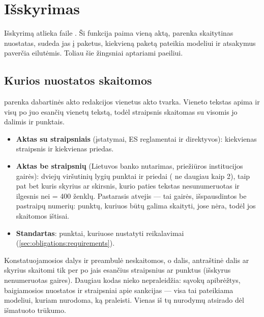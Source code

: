 \section{Išskyrimas}\label{sec:obligations:extraction}

Išskyrimą atlieka  faile . Ši funkcija paima vieną
aktą, parenka skaitytinas nuostatas, sudeda jas į paketus, kiekvieną paketą pateikia modeliui ir
atsakymus paverčia eilutėmis. Toliau šie žingsniai aptariami paeiliui.

\subsection{Kurios nuostatos skaitomos}

 parenka dabartinės akto redakcijos vienetus akto tvarka. Vieneto tekstas
apima ir visų po juo esančių vienetų tekstą, todėl straipsnis skaitomas su visomis jo dalimis ir punktais.

\begin{itemize}
  \item \textbf{Aktas su straipsniais} (įstatymai, ES reglamentai ir direktyvos): kiekvienas
    straipsnis ir kiekvienas priedas.
  \item \textbf{Aktas be straipsnių} (Lietuvos banko nutarimas, priežiūros institucijos gairės):
    dviejų viršutinių lygių punktai ir priedai ( ne daugiau kaip 2), taip pat bet
    kuris skyrius ar skirsnis, kurio paties tekstas nesunumeruotas ir ilgesnis nei
     = 400 ženklų. Pastarasis atvejis --- tai gairės, išspausdintos be
    pastraipų numerių: punktų, kuriuos būtų galima skaityti, jose nėra, todėl jos skaitomos
    ištisai.
  \item \textbf{Standartas}: punktai, kuriuose nustatyti reikalavimai
    (\cref{sec:obligations:requirements}).
\end{itemize}

Konstatuojamosios dalys ir preambulė neskaitomos, o dalis, antraštinė dalis ar skyrius
skaitomi tik per po jais esančius straipsnius ar punktus (išskyrus nenumeruotas gaires). Daugiau
kodas nieko nepraleidžia: sąvokų apibrėžtys, baigiamosios nuostatos ir straipsniai apie sankcijas
--- visa tai pateikiama modeliui, kuriam nurodoma, ką praleisti. Vienas iš tų nurodymų atsirado dėl
išmatuoto trūkumo.

